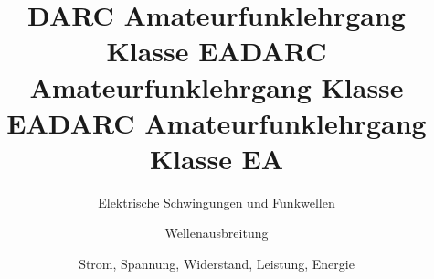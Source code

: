 \documentclass[aspectratio = 169]{beamer}
\begin{document}

\title{DARC Amateurfunklehrgang Klasse EA}
\author{Elektrische Schwingungen und Funkwellen}
\begin{frame}
\maketitle
\end{frame}




\title{DARC Amateurfunklehrgang Klasse EA}
\author{Wellenausbreitung}
\begin{frame}
\maketitle
\end{frame}

























\title{DARC Amateurfunklehrgang Klasse EA}
\author{Strom, Spannung, Widerstand, Leistung, Energie}
\begin{frame}
\maketitle
\end{frame}

















\end{document}
